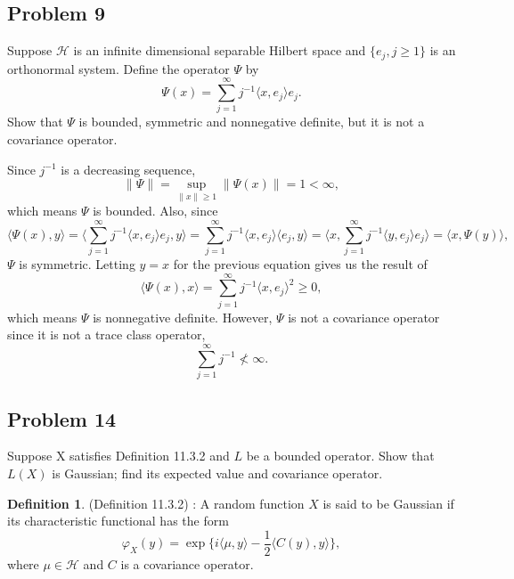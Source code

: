 \documentclass{article}
\theoremstyle{definition}
\newtheorem{definition}{Definition}[section]
\numberwithin{equation}{section}
\begin{document}
\subsection{Problem 9}

\begin{problem}
Suppose $\mathcal{H}$ is an infinite dimensional separable Hilbert space and 
$\{e_{j}, j \geq 1 \}$ is an orthonormal system. Define the operator $\Psi$ by
$$
\Psi(x) = \sum_{j=1}^{\infty} j^{-1} \langle x, e_{j} \rangle e_{j}.
$$
Show that $\Psi$ is bounded, symmetric and nonnegative definite, but it is not a covariance operator.
\end{problem}

\begin{mysol}
Since $j^{-1}$ is a decreasing sequence, $$\lVert \Psi \rVert = \sup_{\lVert x \rVert \geq 1} \lVert \Psi(x) \rVert = 1 < \infty ,$$ 
which means $\Psi$ is bounded.
Also, since 
$$
\langle \Psi(x),y \rangle
= \langle \sum_{j=1}^{\infty} j^{-1} \langle x, e_{j} \rangle e_{j} , y \rangle
= \sum_{j=1}^{\infty} j^{-1} \langle x, e_{j} \rangle \langle e_{j},y  \rangle
= \langle  x, \sum_{j=1}^{\infty} j^{-1} \langle y, e_{j} \rangle e_{j} \rangle 
= \langle x,\Psi(y) \rangle ,
$$
$\Psi$ is symmetric.
Letting $y = x$ for the previous equation gives us the result of
$$
\langle \Psi(x),x \rangle
= \sum_{j=1}^{\infty} j^{-1} {\langle x, e_{j} \rangle}^{2} \geq 0,
$$
which means $\Psi$ is nonnegative definite.
However, $\Psi$ is not a covariance operator since it is not a trace class operator,
$$
\sum_{j=1}^{\infty} j^{-1} \nless \infty .
$$

\end{mysol}

\subsection{Problem 14}

\begin{problem}
Suppose X satisfies Definition 11.3.2 and $L$ be a bounded operator. Show that $L(X)$ is Gaussian; find its expected value and covariance operator. \\
\begin{definition}
(Definition 11.3.2) : A random function $X$ is said to be Gaussian if its characteristic functional has the form
$$
\varphi_{X}(y) = \exp \big\{ i \langle \mu, y \rangle - \frac{1}{2} \langle C(y), y \rangle \big\},
$$
where $\mu \in \mathcal{H}$ and $C$ is a covariance operator.
\end{definition}

\end{problem}
\end{document}
